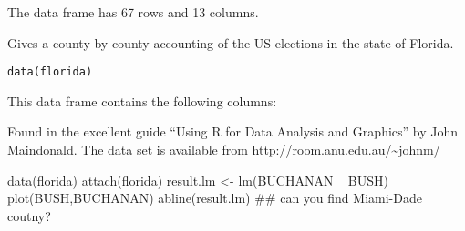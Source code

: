 \begin{Description}\relax
The  data frame has 67 rows and 13 columns.

Gives a county by county accounting of the US elections in the state of
Florida.
\end{Description}
\begin{Usage}
\begin{verbatim}data(florida)\end{verbatim}
\end{Usage}
\begin{Format}\relax
This data frame contains the following columns:
\end{Format}
\begin{Source}\relax
Found in the excellent guide    ``Using R for Data Analysis and
Graphics''  by John Maindonald. The data set is available from
\url{http://room.anu.edu.au/~johnm/}
\end{Source}
\begin{Examples}
\begin{ExampleCode}
data(florida)
attach(florida)
result.lm <- lm(BUCHANAN ~ BUSH)
plot(BUSH,BUCHANAN)
abline(result.lm) ## can you find Miami-Dade coutny?
\end{ExampleCode}
\end{Examples}

